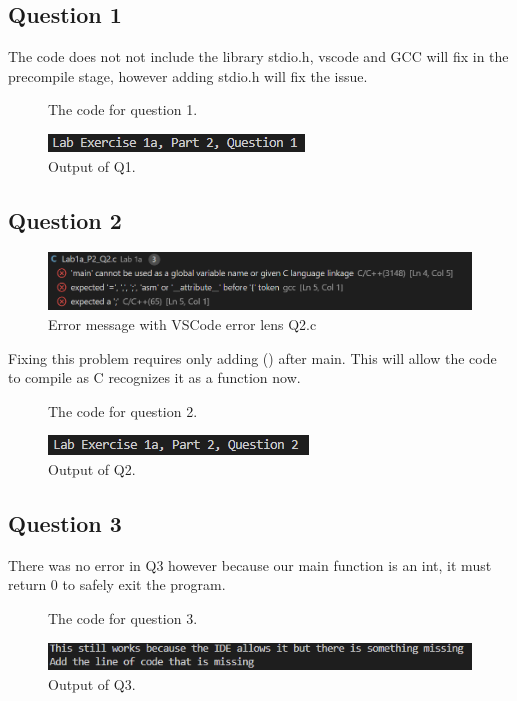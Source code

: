 \documentclass{article}
\begin{document}
\begin{flushleft}
  \subsection{Question 1}
  The code does not not include the library stdio.h, vscode and GCC will fix in the precompile stage, however adding stdio.h will fix the issue.
  \begin{figure}[!ht]
    \centering
    
    \caption{The code for question 1.}
  \end{figure}
  \begin{figure}[!ht]
    \centering
    \includegraphics[width=\linewidth]{Q1-output.png}
    \caption{Output of Q1.}
  \end{figure}
  \subsection{Question 2}
  \begin{figure}[!ht]
    \centering
    \includegraphics[width=\linewidth]{Q2-error.png}
    \caption{Error message with VSCode error lens Q2.c}
  \end{figure}
  Fixing this problem requires only adding () after main. This will allow the code to compile as C recognizes it as a function now.
  \begin{figure}[!ht]
    \centering
    
    \caption{The code for question 2.}
  \end{figure}
  \begin{figure}[!ht]
    \centering
    \includegraphics[width=\linewidth]{Q2-output.png}
    \caption{Output of Q2.}
  \end{figure}
  \subsection{Question 3}
  There was no error in Q3 however because our main function is an int, it must return 0 to safely exit the program.
  \begin{figure}[!ht]
    \centering
    
    \caption{The code for question 3.}
  \end{figure}
  \begin{figure}[!ht]
    \centering
    \includegraphics[width=\linewidth]{Q3-output.png}
    \caption{Output of Q3.}
  \end{figure}

\end{flushleft}
\end{document}
